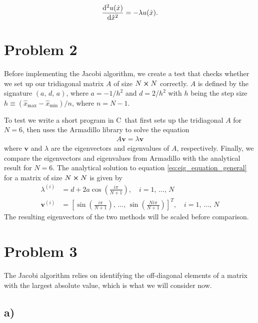 \documentclass[english,notitlepage,nofootinbib]{revtex4-1}  %
\newcommand{\CC}{C\nolinebreak\hspace{-.05em}\raisebox{.4ex}{\tiny\bf +}\nolinebreak\hspace{-.10em}\raisebox{.4ex}{\tiny\bf +}}
\renewcommand{\vec}{\mathbf}
\newcommand{\hx}{\hat{x}}
\newcommand{\closed}[1]{\left( #1 \right)}
\newcommand{\bracket}[1]{\left[ #1 \right]}
\begin{document}
\begin{align}\label{p1_scaled_eq}
    \dv[2]{u(\hat{x})}{\hat{x}} = -\lambda u(\hat{x}).
\end{align}


\section*{Problem 2}
Before implementing the Jacobi algorithm, we create a test that checks whether we set up our tridiagonal matrix $A$ of size $N\cross N$ correctly. $A$ is defined by the signature $(a,\,d,\,a)$, where $a=-1/h^2$ and $d=2/h^2$ with $h$ being the step size $h \equiv(\hx_\mathrm{max}-\hx_\mathrm{min})/n$, where $n=N-1$. 

To test we write a short program in \CC\, that first sets up the tridiagonal $A$ for $N=6$, then uses the Armadillo library to solve the equation
\begin{align}
    A\vec{v} = \lambda \vec{v} \label{eq:eig_equation_general}
\end{align} 
where $\vec{v}$ and $\lambda$ are the eigenvectors and eigenvalues of $A$, respectively. Finally, we compare the eigenvectors and eigenvalues from Armadillo with the analytical result for $N=6$. The analytical solution to equation \eqref{eq:eig_equation_general} for a matrix of size $N\cross N$ is given by  
\begin{align}  
    \lambda^{(i)} &= d + 2a \cos\closed{\frac{i\pi}{N+1}},\quad i=1,\,\dots,\,N \label{eq:eigval}\\
    \vec{v}^{(i)} &= \bracket{ \sin\closed{\frac{i\pi}{N+1}},\,\dots,\,\sin\closed{\frac{Ni\pi}{N+1}} }^T ,\quad i=1,\,\dots,\,N \label{eq:eigvec}
\end{align} 
The resulting eigenvectors of the two methods will be scaled before comparison. 

\section*{Problem 3}
The Jacobi algorithm relies on identifying the off-diagonal elements of a matrix with the largest absolute value, which is what we will consider now. 
\subsection*{a)}
\end{document}

